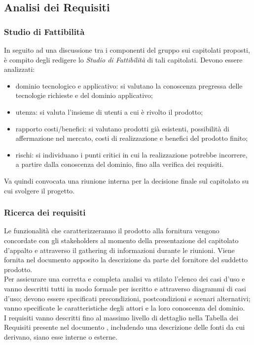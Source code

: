 \subsection{Analisi dei Requisiti}
\subsubsection{Studio di Fattibilità}
In seguito ad una discussione tra i componenti del gruppo sui capitolati proposti, è compito degli \Analisti{} redigere lo \textit{Studio di Fattibilità} di tali capitolati. Devono essere analizzati:
\begin{itemize}
	\item dominio tecnologico e applicativo: si valutano la conoscenza pregressa delle tecnologie richieste e del dominio applicativo;
	\item utenza: si valuta l'insieme di utenti a cui è rivolto il prodotto;
	\item rapporto costi/benefici: si valutano prodotti già esistenti, possibilità di affermazione nel mercato, costi di realizzazione e benefici del prodotto finito;
	\item rischi: si individuano i punti critici in cui la realizzazione potrebbe incorrere, a partire dalla conoscenza del dominio, fino alla verifica dei requisiti.
\end{itemize}
Va quindi convocata una riunione interna per la decisione finale sul capitolato su cui svolgere il progetto.

\subsubsection{Ricerca dei requisiti}
Le funzionalità che caratterizzeranno il prodotto alla fornitura vengono concordate con gli stakeholders al momento della presentazione del capitolato d'appalto e attraverso il gathering di informazioni durante le riunioni. Viene fornita nel documento apposito \AnalisiDeiRequisiti{} la descrizione da parte del fornitore del suddetto prodotto.\\
Per assicurare una corretta e completa analisi va stilato l'elenco dei casi d'uso e vanno descritti tutti in modo formale per iscritto e attraverso diagrammi di casi d'uso; devono essere specificati precondizioni, postcondizioni e scenari alternativi; vanno specificate le caratteristiche degli attori e la loro conoscenza del dominio.\\
I requisiti vanno descritti fino al massimo livello di dettaglio nella Tabella dei Requisiti presente nel documento \AnalisiDeiRequisiti, includendo una descrizione delle fonti da cui derivano, siano esse interne o esterne.


